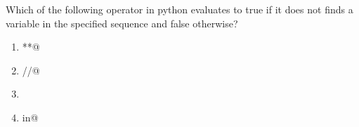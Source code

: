 \question
Which of the following operator in python evaluates to true if it does not finds a variable in the specified sequence and false otherwise?

\begin{enumerate}
\item \lstinline@**@
\item \lstinline@//@
\item \lstinline@is@
\item \lstinline@not in@
\end{enumerate}

